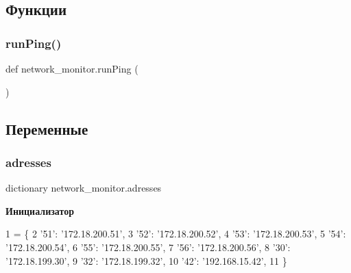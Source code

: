 \subsection{Функции}
\mbox{\label{namespacenetwork__monitor_aa615228bd6f33e03eb168421f8980368}} 
\subsubsection{\texorpdfstring{run\+Ping()}{runPing()}}
{\footnotesize\ttfamily def network\+\_\+monitor.\+run\+Ping (\begin{DoxyParamCaption}{ }\end{DoxyParamCaption})}



\subsection{Переменные}
\mbox{\label{namespacenetwork__monitor_a58f207986e588fcaab74394ee1cf1bcb}} 
\subsubsection{\texorpdfstring{adresses}{adresses}}
{\footnotesize\ttfamily dictionary network\+\_\+monitor.\+adresses}

{\bfseries Инициализатор}
\begin{DoxyCode}
1 =  \{
2     \textcolor{stringliteral}{'51'}: \textcolor{stringliteral}{'172.18.200.51'},
3     \textcolor{stringliteral}{'52'}: \textcolor{stringliteral}{'172.18.200.52'},
4     \textcolor{stringliteral}{'53'}: \textcolor{stringliteral}{'172.18.200.53'},
5     \textcolor{stringliteral}{'54'}: \textcolor{stringliteral}{'172.18.200.54'},
6     \textcolor{stringliteral}{'55'}: \textcolor{stringliteral}{'172.18.200.55'},
7     \textcolor{stringliteral}{'56'}: \textcolor{stringliteral}{'172.18.200.56'},
8     \textcolor{stringliteral}{'30'}: \textcolor{stringliteral}{'172.18.199.30'},
9     \textcolor{stringliteral}{'32'}: \textcolor{stringliteral}{'172.18.199.32'},
10     \textcolor{stringliteral}{'42'}: \textcolor{stringliteral}{'192.168.15.42'},   
11 \}
\end{DoxyCode}
\mbox{\label{namespacenetwork__monitor_a0217c896f3b1258aa8de32cf83f58221}} 
